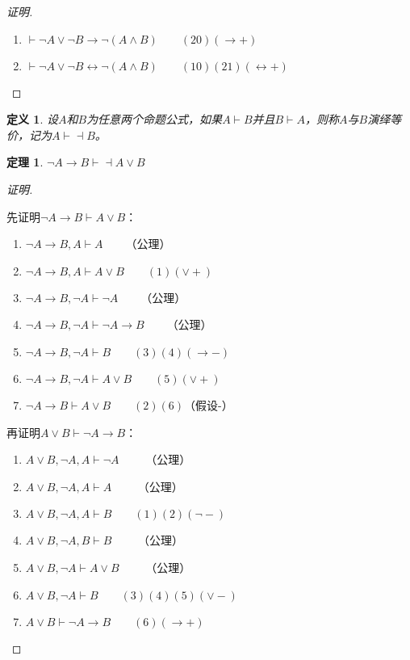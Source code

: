 \documentclass{article}
\newtheorem{Def}{定义}
\newtheorem{Thm}{定理}
\begin{document}
\begin{CJK*}{UTF8}{gbsn}
\begin{proof}[证明]
\begin{enumerate}
      \item $ \vdash\lnot A \lor \lnot B \to \lnot(A\land B)\qquad(20)(\to +)$
      \item $ \vdash\lnot A \lor \lnot B \leftrightarrow \lnot(A\land B)\qquad(10)(21)(\leftrightarrow +)$  
    \end{enumerate}
  \end{proof}
\begin{Def}
  设$A$和$B$为任意两个命题公式，如果$A\vdash B$并且$B\vdash A$，则称$A$与$B$演绎等价，记为$A\vdash \dashv B$。
\end{Def}
  \begin{Thm}$\lnot A\to B\vdash \dashv A\lor B$\end{Thm}
  \begin{proof}[证明]$\quad$

    先证明$\lnot A\to B\vdash A\lor B$：
    \begin{enumerate}
      \item $ \lnot A\to B, A\vdash A\qquad $（公理） 
      \item $ \lnot A\to B, A\vdash A\lor B\qquad (1)(\lor +)$
      \item $ \lnot A\to B, \lnot A\vdash \lnot A\qquad $（公理）
      \item $ \lnot A\to B, \lnot A\vdash \lnot A\to B\qquad $（公理）
      \item $ \lnot A\to B, \lnot A\vdash B\qquad (3)(4)(\to -)$
      \item  $ \lnot A\to B, \lnot A\vdash A \lor B\qquad (5)(\lor +)$
      \item $ \lnot A\to B\vdash A \lor B\qquad (2)(6)$（假设-） 
    \end{enumerate}
    再证明$A\lor B\vdash \lnot A\to B$：
    \begin{enumerate}
      \item $ A\lor B, \lnot A, A\vdash\lnot A\qquad $ （公理）
      \item $ A\lor B, \lnot A, A\vdash A\qquad $ （公理）
      \item$ A\lor B, \lnot A, A\vdash B\qquad (1)(2)(\lnot -)$ 
      \item $ A\lor B, \lnot A, B\vdash B\qquad $ （公理）
      \item $ A\lor B, \lnot A\vdash A\lor B\qquad $ （公理）
      \item $ A\lor B, \lnot A\vdash B\qquad (3)(4)(5)(\lor -)$ 
      \item $ A\lor B \vdash \lnot A\to B\qquad (6)(\to +)$  
    \end{enumerate}
  \end{proof}


\end{CJK*}
\end{document}
